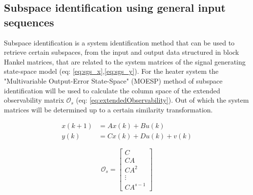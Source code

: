 \subsection{Subspace identification using general input sequences}
Subspace identification is a system identification method that can be used to retrieve certain subspaces, from the input and output data structured in block Hankel matrices, that are related to the system matrices of the signal generating state-space model (eq: \ref{eq:sgs_x},\ref{eq:sgs_y}). For the heater system the "Multivariable Output-Error State-Space" (MOESP) method \cite[p.~301--312]{FilteringIdentification} of subspace identification will be used to calculate the column space of the extended observability matrix $\mathcal{O}_s$ (eq: \ref{eq:extendedObservability}). Out of which the system matrices will be determined up to a certain similarity transformation. 

\begin{align}
    x(k+1) &= Ax(k) + Bu(k) \label{eq:sgs_x}\\
    y(k) &= Cx(k) + Du(k) + v(k) \label{eq:sgs_y}
\end{align}

\begin{equation}
\mathcal{O}_s = \left[\begin{array}{c}
C \\
C A \\
C A^{2} \\
\vdots \\
C A^{s-1}
\end{array}\right]
\label{eq:extendedObservability}
\end{equation}

